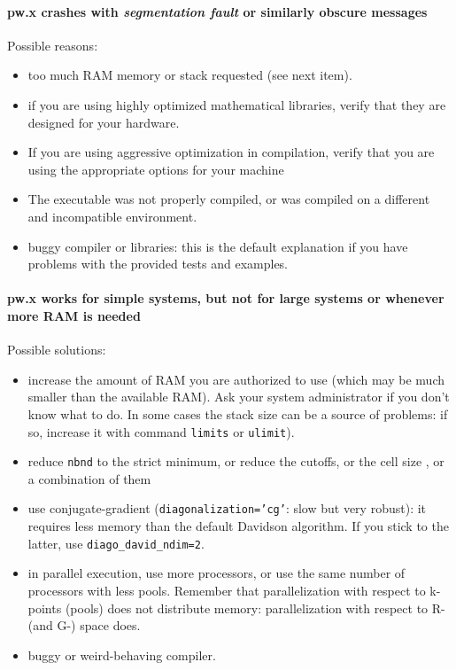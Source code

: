 \documentclass[12pt,a4paper]{article}
\begin{document}
\paragraph{pw.x crashes with {\em segmentation fault} or similarly
  obscure messages} 
Possible reasons:
\begin{itemize}
\item  too much RAM memory or stack  requested (see next item). 
\item if you are using highly optimized mathematical libraries, verify
  that they are designed for your hardware.
\item If you are using aggressive optimization in compilation, verify
that you are using the appropriate options for your machine
\item The executable was not properly compiled, or was compiled on
a different and incompatible environment.
\item buggy compiler or libraries: this is the default explanation if you
have problems with the provided tests and examples.
\end{itemize}

\paragraph{pw.x works for simple systems, but not for large systems
  or whenever more RAM is needed}  
Possible solutions:
\begin{itemize}
\item increase the amount of RAM you are authorized to use (which may
  be much smaller than the available RAM). Ask your system
  administrator if you don't know what to do. In some cases the 
  stack size can be a source of problems: if so, increase it with command 
  \texttt{limits} or \texttt{ulimit}).
\item reduce \texttt{nbnd} to the strict minimum, or reduce the cutoffs, or the
  cell size , or a combination of them
\item  use conjugate-gradient (\texttt{diagonalization='cg'}: slow but very
  robust): it requires less memory than the default Davidson
  algorithm.  If you stick to the latter, use \texttt{diago\_david\_ndim=2}.
\item in parallel execution, use more processors, or use the same
  number of processors with less pools. Remember that parallelization
  with respect to k-points (pools) does not distribute memory:
  parallelization with respect to R- (and G-) space does. 
\item buggy or weird-behaving compiler.
\end{itemize}
\end{document}
